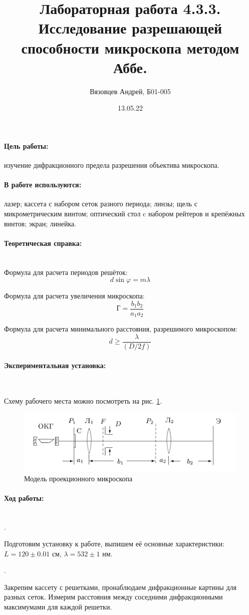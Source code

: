 \documentclass[a4paper, 12pt]{article}
\author{Вязовцев Андрей, Б01-005}
\date{13.05.22}
\title{Лабораторная работа 4.3.3. Исследование разрешающей способности микроскопа методом Аббе.}
\renewcommand{\phi}{\varphi}
\newcommand{\parag}[1]{\paragraph*{#1:}}
\newcounter{Points}
\newcommand{\point}{\arabic{Points}. \addtocounter{Points}{1}}
\begin{document}
\maketitle

\parag {Цель работы} изучение дифракционного предела разрешения объектива микроскопа.

\parag {В работе используются} лазер; кассета с набором сеток разного периода; линзы; щель с микрометрическим винтом; оптический стол c набором рейтеров и крепёжных винтов; экран; линейка.

\parag {Теоретическая справка} ~\\

Формула для расчета периодов решёток:
\begin{equation*}
	d \sin \phi = m \lambda
\end{equation*}

Формула для расчета увеличения микроскопа:
\begin{equation*}
	Г = \dfrac{b_1 b_2}{a_1 a_2}            
\end{equation*}

Формула для расчета минимального расстояния, разрешимого микроскопом:
\begin{equation*}
	d \geq \dfrac{\lambda}{\left( D / 2f \right)} 
\end{equation*}

\parag {Экспериментальная установка} ~

Схему рабочего места можно посмотреть на рис. \ref{pic1}.

\begin{figure}[!h]
    \centering
    \includegraphics[scale = 0.3]{pic1.png}
    \caption{Модель проекционного микроскопа}
    \label{pic1}
\end{figure}

\parag {Ход работы} ~\\

\point Подготовим установку к работе, выпишем её основные характеристики: $L = 120 \pm 0.01$ см, $\lambda = 532 \pm 1$ нм.

\point Закрепим кассету с решетками, пронаблюдаем дифракционные картины для разных сеток. Измерим расстояния между соседними дифракционными максимумами для каждой решетки.
\end{document}
